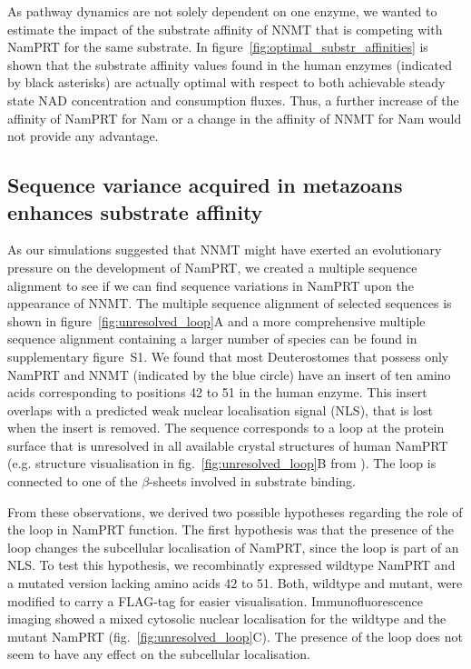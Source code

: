 As pathway dynamics are not solely dependent on one enzyme, we wanted to estimate the impact of the substrate affinity of NNMT that is competing with NamPRT for the same substrate. In figure~\ref{fig:optimal_substr_affinities} is shown that the substrate affinity values found in the human enzymes (indicated by black asterisks) are actually optimal with respect to both achievable steady state NAD concentration and consumption fluxes. Thus, a further increase of the affinity of NamPRT for Nam or a change in the affinity of NNMT for Nam would not provide any advantage.


\subsection{Sequence variance acquired in metazoans enhances substrate affinity}

As our simulations suggested that NNMT might have exerted an evolutionary pressure on the development of NamPRT, we created a multiple sequence alignment to see if we can find sequence variations in NamPRT upon the appearance of NNMT. The multiple sequence alignment of selected sequences is shown in figure~\ref{fig:unresolved_loop}A and a more comprehensive multiple sequence alignment containing a larger number of species can be found in supplementary figure~S1. We found that most Deuterostomes that possess only NamPRT and NNMT (indicated by the blue circle) have an insert of ten amino acids corresponding to positions 42 to 51 in the human enzyme. This insert overlaps with a predicted weak nuclear localisation signal (NLS), that is lost when the insert is removed. The sequence corresponds to a loop at the protein surface that is unresolved in all available crystal structures of human NamPRT (e.g. structure visualisation in fig.~\ref{fig:unresolved_loop}B from \cite{Wang2006}). The loop is connected to one of the $\beta$-sheets involved in substrate binding.

From these observations, we derived two possible hypotheses regarding the role of the loop in NamPRT function. The first hypothesis was that the presence of the loop changes the subcellular localisation of NamPRT, since the loop is part of an NLS. To test this hypothesis, we recombinatly expressed wildtype NamPRT and a mutated version lacking amino acids 42 to 51. Both, wildtype and mutant, were modified to carry a FLAG-tag for easier visualisation. Immunofluorescence imaging showed a mixed cytosolic nuclear localisation for the wildtype and the mutant NamPRT (fig.~\ref{fig:unresolved_loop}C). The presence of the loop does not seem to have any effect on the subcellular localisation.

